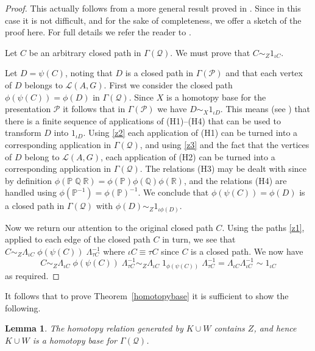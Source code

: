 \documentclass[11pt]{amsart}
\newtheorem{lem}{Lemma}
\theoremstyle{plain}
\begin{document}
\begin{proof}
This actually follows from a more general result proved in \cite{Malheiro2}. Since in this case it is not difficult, and for the sake of completeness, we offer a sketch of the proof here. For full details we refer the reader to \cite{Malheiro2}.

Let $C$ be an arbitrary closed path in $\Gamma(\mathcal{Q})$. We must prove that $C \sim_Z 1_{\iota C}$.

Let $D = \psi(C)$, noting that $D$ is a closed path in $\Gamma(\mathcal{P})$ and that each vertex of $D$ belongs to ${\mathcal{L}({A,G})}$. First we consider the closed path $\phi(\psi(C)) = \phi(D)$ in $\Gamma(\mathcal{Q})$. Since $X$ is a homotopy base for the presentation $\mathcal{P}$ it follows that in $\Gamma(\mathcal{P})$ we have $D \sim_X 1_{\iota D}$. This means (see \cite[Lemma~2.1]{K2}) that there is a finite sequence of applications of (H1)--(H4) that can be used to transform $D$ into $1_{\iota D}$. Using \eqref{z2} each application of (H1) can be turned into a corresponding application in    $\Gamma(\mathcal{Q})$, and using \eqref{z3} and the fact that the vertices of $D$ belong to ${\mathcal{L}({A,G})}$, each application of (H2) can be turned into a corresponding application in $\Gamma(\mathcal{Q})$. The relations (H3) may be dealt with since by definition $\phi({\mathbb{P}}\; {\mathbb{Q}}\; {\mathbb{R}}) = \phi({\mathbb{P}}) \phi({\mathbb{Q}}) \phi({\mathbb{R}})$, and the relations (H4) are handled using $\phi({\mathbb{P}}^{-1}) = \phi({\mathbb{P}})^{-1}$. We conclude that  $\phi(\psi(C)) = \phi(D)$ is a closed path in $\Gamma(\mathcal{Q})$ with $\phi(D) \sim_Z 1_{\iota \phi(D)}$.

Now we return our attention to the original closed path $C$. Using the paths \eqref{z1}, applied to each edge of the closed path $C$ in turn, we see that $C \sim_Z  \Lambda_{\iota C}\; \phi(\psi(C)) \; \Lambda_{\tau C}^{-1}$ where $\iota C \equiv \tau C$ since $C$ is a closed path. We now have
\[
C \sim_Z  \Lambda_{\iota C}\; \phi(\psi(C)) \; \Lambda_{\tau C}^{-1}  \sim_Z \Lambda_{\iota C}\; 1_{\phi(\psi(C))} \; \Lambda_{\tau C}^{-1} = \Lambda_{\iota C} \Lambda_{\iota C}^{-1} \sim 1_{\iota C}
\]
as required. \end{proof}

It follows that to prove Theorem~\ref{homotopybase} it is sufficient to show the following.

\begin{lem}\label{KcupW}
The homotopy relation generated by $K \cup W$ contains $Z$, and hence $K \cup W$ is a homotopy base for $\Gamma(\mathcal{Q})$.
\end{lem}
\end{document}
